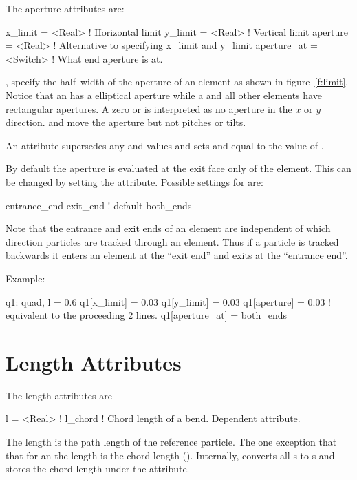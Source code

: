The aperture attributes are:
\begin{example}
  x_limit  = <Real>      ! Horizontal limit
  y_limit  = <Real>      ! Vertical limit
  aperture = <Real>      ! Alternative to specifying x_limit and y_limit
  aperture_at = <Switch> ! What end aperture is at.
\end{example}
,  specify the half--width of the aperture of
an element as shown in figure~\ref{f:limit}. Notice that an 
has a elliptical aperture while a  and all other elements
have rectangular apertures. A zero  or
 is interpreted as no aperture in the $x$ or $y$
direction.  and  move the aperture but not
pitches or tilts.

An  attribute supersedes
any  and  values and sets  and
 equal to the value of .

By default the aperture is evaluated at the exit face only of the
element. This can be changed by setting the  attribute.
Possible settings for  are:
\begin{example}
  entrance_end
  exit_end  ! default
  both_ends
\end{example}
Note that the entrance and exit ends of an element are independent of
which direction particles are tracked through an element. Thus if a
particle is tracked backwards it enters an element at the ``exit end''
and exits at the ``entrance end''.

Example:
\begin{example}
  q1: quad, l = 0.6
  q1[x_limit] = 0.03
  q1[y_limit] = 0.03
  q1[aperture] = 0.03  ! equivalent to the proceeding 2 lines.  
  q1[aperture_at] = both_ends
\end{example}

\section{Length Attributes}
\label{s:l}

The length attributes are
\begin{example}
  l       = <Real>  ! 
  l_chord           ! Chord length of a bend. Dependent attribute.
\end{example}
The length  is the path length of the reference
particle. The one exception that that for an  the length
 is the chord length (). Internally, \bmad converts
all s to s and stores the chord length
under the  attribute.

